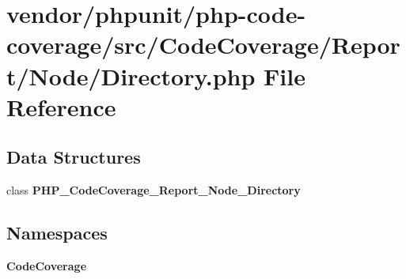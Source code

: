 \section{vendor/phpunit/php-\/code-\/coverage/src/\+Code\+Coverage/\+Report/\+Node/\+Directory.php File Reference}
\label{phpunit_2php-code-coverage_2src_2_code_coverage_2_report_2_node_2_directory_8php}
\subsection*{Data Structures}
\begin{DoxyCompactItemize}
\item 
class {\bf P\+H\+P\+\_\+\+Code\+Coverage\+\_\+\+Report\+\_\+\+Node\+\_\+\+Directory}
\end{DoxyCompactItemize}
\subsection*{Namespaces}
\begin{DoxyCompactItemize}
\item 
 {\bf Code\+Coverage}
\end{DoxyCompactItemize}
